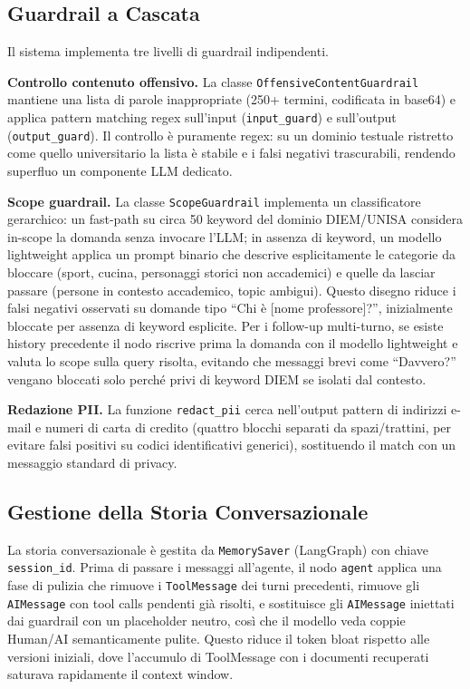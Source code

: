 \documentclass[11pt,a4paper]{article}
\newcommand{\code}[1]{\texttt{\small#1}}
\begin{document}
\subsection{Guardrail a Cascata}
\label{sec:guardrail}

Il sistema implementa tre livelli di guardrail indipendenti.

\textbf{Controllo contenuto offensivo.} La classe \code{OffensiveContentGuardrail} mantiene
una lista di parole inappropriate (250+ termini, codificata in base64) e applica pattern
matching regex sull'input (\code{input\_guard}) e sull'output (\code{output\_guard}). Il
controllo è puramente regex: su un dominio testuale ristretto come quello universitario la
lista è stabile e i falsi negativi trascurabili, rendendo superfluo un componente LLM
dedicato.

\textbf{Scope guardrail.} La classe \code{ScopeGuardrail} implementa un classificatore
gerarchico: un fast-path su circa 50 keyword del dominio DIEM/UNISA considera in-scope la
domanda senza invocare l'LLM; in assenza di keyword, un modello lightweight applica un
prompt binario che descrive esplicitamente le categorie da bloccare (sport, cucina,
personaggi storici non accademici) e quelle da lasciar passare (persone in contesto
accademico, topic ambigui). Questo disegno riduce i falsi negativi osservati su domande
tipo ``Chi è [nome professore]?'', inizialmente bloccate per assenza di keyword esplicite.
Per i follow-up multi-turno, se esiste history precedente il nodo riscrive prima la
domanda con il modello lightweight e valuta lo scope sulla query risolta, evitando che
messaggi brevi come ``Davvero?'' vengano bloccati solo perché privi di keyword DIEM se
isolati dal contesto.

\textbf{Redazione PII.} La funzione \code{redact\_pii} cerca nell'output pattern di
indirizzi e-mail e numeri di carta di credito (quattro blocchi separati da spazi/trattini,
per evitare falsi positivi su codici identificativi generici), sostituendo il match con un
messaggio standard di privacy.

\subsection{Gestione della Storia Conversazionale}

La storia conversazionale è gestita da \code{MemorySaver} (LangGraph) con chiave
\code{session\_id}. Prima di passare i messaggi all'agente, il nodo \code{agent} applica
una fase di pulizia che rimuove i \code{ToolMessage} dei turni precedenti, rimuove gli
\code{AIMessage} con tool calls pendenti già risolti, e sostituisce gli \code{AIMessage}
iniettati dai guardrail con un placeholder neutro, così che il modello veda coppie
Human/AI semanticamente pulite. Questo riduce il token bloat rispetto alle versioni
iniziali, dove l'accumulo di ToolMessage con i documenti recuperati saturava rapidamente
il context window.
\end{document}
